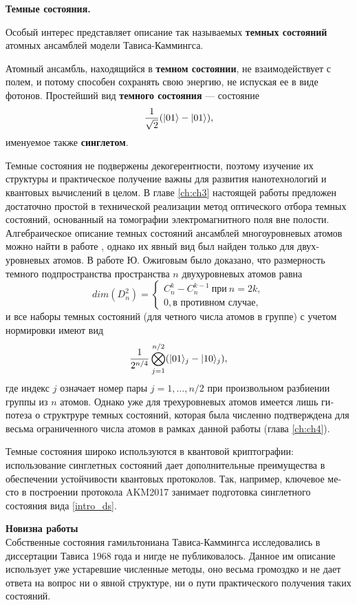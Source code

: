 \clearpage
\indent\textbf{Темные состояния.}

Особый интерес представляет описание так называемых \textbf{темных состояний} \cite{kok,ozhigov_dimension} атомных ансамблей модели Тависа-Каммингса.

Атомный ансамбль, находящийся в \textbf{темном состоянии}, не взаимодействует с полем, и потому способен сохранять свою энергию, не испуская ее в виде фотонов. Простейший вид \textbf{темного состояния} --- состояние 
\begin{equation}\label{intro_ds}
	\frac{1}{\sqrt{2}}(|01\rangle - |01\rangle),
\end{equation}
именуемое также \textbf{синглетом}.

Темные состояния не подвержены декогерентности, поэтому изучение их структуры и практическое получение важны для развития нанотехнологий и квантовых вычислений в целом. В главе \ref{ch:ch3} настоящей работы предложен до­статочно простой в технической реализации метод оптического отбора темных состояний, основанный на томографии электромагнитного поля вне полости. Алгебраическое описание темных состояний ансамблей многоуровневых атомов можно найти в работе \cite{kok}, однако их явный вид был найден только для двух­ уровневых атомов. В работе \cite{ozhigov_dimension} Ю. Ожиговым было доказано, что размерность темного подпространства пространства $n$ двухуровневых атомов равна
\[
dim(D_{n}^2) =	
\begin{cases}
	C_{n}^{k} - C_{n}^{k-1}~\text{при}~n = 2k, \\
	0, \text{в противном случае},
\end{cases}
\]
и все наборы темных состояний (для четного числа атомов в группе) с учетом нормировки имеют вид 
\[
\frac{1}{2^{n/4}}\bigotimes_{j=1}^{n/2}(|01\rangle_{j}-|10\rangle_{j}),
\]
где индекс $j$ означает номер пары $j = 1,\dots, n/2$ при произвольном разбиении группы из $n$ атомов. Однако уже для трехуровневых атомов имеется лишь ги­потеза о структруре темных состояний, которая была численно подтверждена для весьма ограниченного числа атомов в рамках данной работы (глава \ref{ch:ch4}).

Темные состояния широко используются в квантовой криптографии: использование синглетных состояний дает дополнительные преимущества в обеспечении устойчивости квантовых протоколов. Так, например, ключевое ме­ сто в построении протокола AKM2017 \cite{akm2017} занимает подготовка синглетного состояния вида \eqref{intro_ds}.

\clearpage
\textbf{Новизна работы}\\
\indent Собственные состояния гамильтониана Тависа-Каммингса исследовались в диссертации Тависа \cite{tc_exact_solution} 1968 года и нигде не публиковалось. Данное им опи­сание использует уже устаревшие численные методы, оно весьма громоздко и не дает ответа на вопрос ни о явной структуре, ни о пути практического по­лучения таких состояний.

